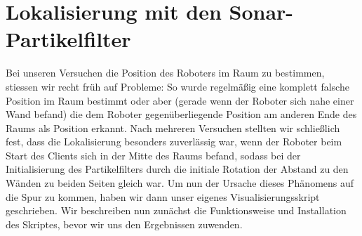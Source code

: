 \section{Lokalisierung mit den Sonar-Partikelfilter}
Bei unseren Versuchen die Position des Roboters im Raum zu bestimmen,
stiessen wir recht früh auf Probleme: So wurde regelmäßig eine
komplett falsche Position im Raum bestimmt oder aber (gerade wenn der
Roboter sich nahe einer Wand befand) die dem Roboter gegenüberliegende
Position am anderen Ende des Raums als Position erkannt.  Nach
mehreren Versuchen stellten wir schließlich fest, dass die
Lokalisierung besonders zuverlässig war, wenn der Roboter beim Start
des Clients sich in der Mitte des Raums befand, sodass bei der
Initialisierung des Partikelfilters durch die initiale Rotation der
Abstand zu den Wänden zu beiden Seiten gleich war. Um nun der Ursache
dieses Phänomens auf die Spur zu kommen, haben wir dann unser eigenes
Visualisierungsskript geschrieben. Wir beschreiben nun zunächst die
Funktionsweise und Installation des Skriptes, bevor wir uns den
Ergebnissen zuwenden.


%


